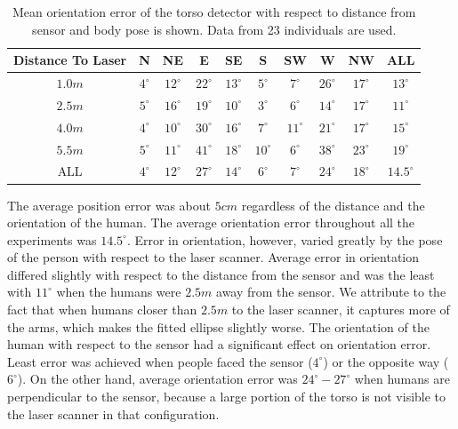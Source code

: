 \begin{table}[ht!]
\centering
\begin{tabular}{cSSSSSSSSS}    
 \toprule 
Distance To Laser & {N} & {NE} & {E} & {SE} & {S} & {SW} & {W} & {NW} & {ALL}\\
\midrule
{$1.0m$} & {$4^{\circ}$} & {$12^{\circ}$} & {$22^{\circ}$} & {$13^{\circ}$} & {$5^{\circ}$} & {$7^{\circ}$} & {$26^{\circ}$} & {$17^{\circ}$} & {$13^{\circ}$} \\
{$2.5m$} & {$5^{\circ}$} & {$16^{\circ}$} & {$19^{\circ}$} & {$10^{\circ}$} & {$3^{\circ}$} & {$6^{\circ}$} & {$14^{\circ}$} & {$17^{\circ}$} & {$11^{\circ}$} \\ 

{$4.0m$} & {$4^{\circ}$} & {$10^{\circ}$} & {$30^{\circ}$} & {$16^{\circ}$} & {$7^{\circ}$} & {$11^{\circ}$} & {$21^{\circ}$} & {$17^{\circ}$} & {$15^{\circ}$} \\ 
{$5.5m$} & {$5^{\circ}$} & {$11^{\circ}$} & {$41^{\circ}$} & {$18^{\circ}$} & {$10^{\circ}$} & {$6^{\circ}$} & {$38^{\circ}$} & {$23^{\circ}$} & {$19^{\circ}$} \\ 

{ALL} & {$4^{\circ}$} & {$12^{\circ}$} & {$27^{\circ}$} & {$14^{\circ}$} & {$6^{\circ}$} & {$7^{\circ}$} & {$24^{\circ}$} & {$18^{\circ}$} & {$14.5^{\circ}$} \\
\bottomrule
\end{tabular}
\caption{Mean orientation error of the torso detector with respect to distance from sensor and body pose is shown. Data from 23 individuals are used.}
\label{table:torso_tracking_results}
\end{table}

The average position error was about $5cm$ regardless of the distance and the orientation of the human. The average orientation error throughout all the experiments was $14.5^{\circ}$. Error in orientation, however, varied greatly by the pose of the person with respect to the laser scanner. Average error in orientation differed slightly with respect to the distance from the sensor and was the least with $11^{\circ}$ when the humans were $2.5m$ away from the sensor. We attribute to the fact that when humans closer than $2.5m$ to the laser scanner, it captures more of the arms, which makes the fitted ellipse slightly worse. The orientation of the human with respect to the sensor had a significant effect on orientation error. Least error was achieved when people faced the sensor  ($4^{\circ}$) or the opposite way ($6^{\circ}$). On the other hand, average orientation error was $24^{\circ}-27^{\circ}$ when humans are perpendicular to the sensor, because a large portion of the torso is not visible to the laser scanner in that configuration.


